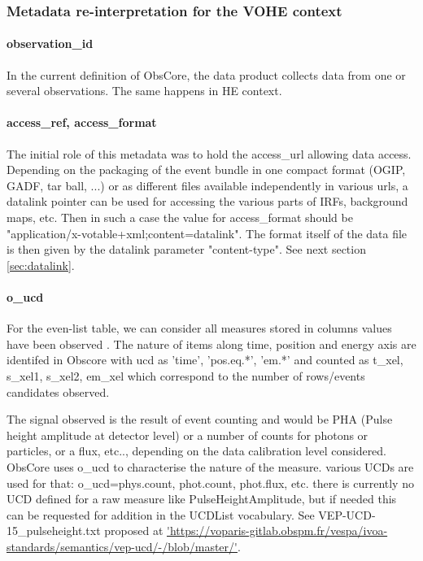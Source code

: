 \documentclass[11pt,a4paper]{ivoa}
\begin{document}
\subsubsection{Metadata re-interpretation for the VOHE context}

\paragraph{observation\_id}
In the current definition of ObsCore, the data product collects data from one or several observations. The same happens in HE context.

\paragraph{access\_ref, access\_format}
The initial role of this metadata was to hold the access\_url allowing data access.
Depending on the packaging of the event bundle in one compact format (OGIP, GADF, tar ball, ...)
or as different files available independently in various urls, a datalink pointer can be used for accessing the various parts of IRFs, background maps, etc.
Then in such a case the value for access\_format should be "application/x-votable+xml;content=datalink". The format itself of the data file is then given by the datalink parameter "content-type".
See next section \ref{sec:datalink}.

\paragraph{o\_ucd}
For the even-list table, we can consider all measures stored in columns values have been observed .
The nature of items along time, position and energy axis are identifed in Obscore with ucd as 'time', 'pos.eq.*', 'em.*'
and counted as t\_xel, s\_xel1, s\_xel2, em\_xel which correspond to the number of rows/events candidates observed.

The signal observed is the result of event counting and would be PHA (Pulse height amplitude at detector level) or a number of counts for photons or particles, or a flux, etc.., depending on the data calibration level considered.
ObsCore uses o\_ucd to characterise the nature of the measure.
various UCDs are used for that: o\_ucd=phys.count, phot.count, phot.flux, etc. there is currently no UCD defined for a raw measure like PulseHeightAmplitude, but if needed this can be requested for addition in the UCDList vocabulary. See VEP-UCD-15\_pulseheight.txt proposed at \url{'https://voparis-gitlab.obspm.fr/vespa/ivoa-standards/semantics/vep-ucd/-/blob/master/'}.
\end{document}
